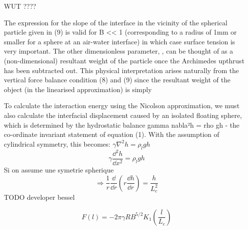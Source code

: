     WUT ????

    The expression for the slope of the interface in the vicinity of the spherical particle given in (9) is valid for B << 1 (corresponding to a radius of  1mm or smaller for a sphere at an air-water interface) in which case surface tension is very important. The other dimensionless parameter, , can be thought of as a (non-dimensional) resultant weight of the particle once the Archimedes upthrust has been subtracted out. This physical interpretation arises naturally from the vertical force balance condition (8) and (9) since the resultant weight of the object (in the linearised approximation) is simply 

    To calculate the interaction energy using the Nicolson
    approximation, we must also calculate the interfacial displacement caused by an isolated floating sphere, which is determined by the hydrostatic balance gamma nabla²h = rho gh - the co-ordinate invariant statement of equation (1). With the assumption of cylindrical symmetry, this becomes:
    \(\gamma \nabla^2h = \rho_l g h\)
    \begin{equation}
        \gamma \frac{\dd^2h}{\dd x^2} = \rho_l g h
    \end{equation}
    Si on assume une symetrie spherique
    \begin{equation}
        \Rightarrow \frac{1}{r} \frac{\dd}{\dd r} \left( r\frac{\dd h}{\dd r}\right) = \frac{h}{L_c^2}
    \end{equation}
    TODO developer bessel
    \cite{introtoBessel}

    \begin{equation}
        \label{ForceEntreCheerios}
        F(l) = -2\pi \gamma R B^{5/2} K_1 \left( \frac{l}{L_c}\right)
    \end{equation}

